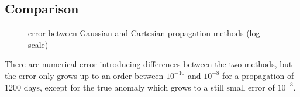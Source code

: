 \documentclass[11pt,a4paper]{report}
\begin{document}
\subsection{Comparison}
\par
\begin{figure}[H]
\centering
{}
    \caption{error between Gaussian and Cartesian propagation methods (log scale)}
\end{figure}

\par
There are numerical error introducing differences between the two methods, but the error only grows up to an order between $10^{-10}$ and $10^{-8}$ for a propagation of 1200 days, except for the true anomaly which grows to a still small error of $10^{-3}$.
\end{document}
